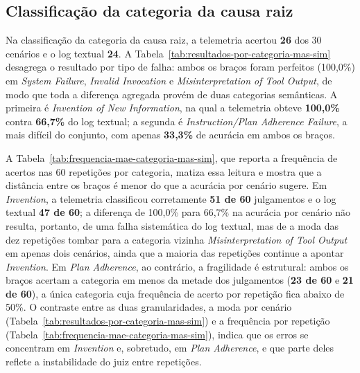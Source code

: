 \documentclass[sigconf]{acmart}
\begin{document}
\subsection{Classificação da categoria da causa raiz}
\label{subsec:categoria}

Na classificação da categoria da causa raiz, a telemetria acertou \textbf{26} dos 30 cenários e o log textual
\textbf{24}. A Tabela~\ref{tab:resultados-por-categoria-mas-sim} desagrega o resultado por tipo de falha: ambos os
braços foram perfeitos (100,0\%) em \textit{System Failure}, \textit{Invalid Invocation} e \textit{Misinterpretation of
	Tool Output}, de modo que toda a diferença agregada provém de duas categorias semânticas. A primeira é
\textit{Invention of New Information}, na qual a telemetria obteve \textbf{100,0\%} contra \textbf{66,7\%} do log
textual; a segunda é \textit{Instruction/Plan Adherence Failure}, a mais difícil do conjunto, com apenas
\textbf{33,3\%} de acurácia em ambos os braços.

A Tabela~\ref{tab:frequencia-mae-categoria-mas-sim}, que reporta a frequência de acertos nas 60 repetições por
categoria, matiza essa leitura e mostra que a distância entre os braços é menor do que a acurácia por cenário sugere.
Em \textit{Invention}, a telemetria classificou corretamente \textbf{51 de 60} julgamentos e o log textual \textbf{47
	de 60}; a diferença de 100,0\% para 66,7\% na acurácia por cenário não resulta, portanto, de uma falha sistemática do
log textual, mas de a moda das dez repetições tombar para a categoria vizinha \textit{Misinterpretation of Tool Output}
em apenas dois cenários, ainda que a maioria das repetições continue a apontar \textit{Invention}. Em \textit{Plan
	Adherence}, ao contrário, a fragilidade é estrutural: ambos os braços acertam a categoria em menos da metade dos
julgamentos (\textbf{23 de 60} e \textbf{21 de 60}), a única categoria cuja frequência de acerto por repetição fica
abaixo de 50\%. O contraste entre as duas granularidades, a moda por cenário
(Tabela~\ref{tab:resultados-por-categoria-mas-sim}) e a frequência por repetição
(Tabela~\ref{tab:frequencia-mae-categoria-mas-sim}), indica que os erros se concentram em \textit{Invention} e,
sobretudo, em \textit{Plan Adherence}, e que parte deles reflete a instabilidade do juiz entre repetições.
\end{document}
